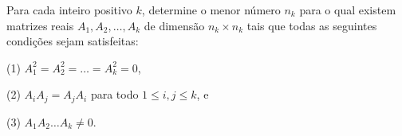 Para cada inteiro positivo \( k\), determine o menor número \( n_{k}\) para o qual existem matrizes reais \( A_{1}, A_{2}, \ldots, A_{k}\) de dimensão \( n_{k}\times n_{k}\) tais que todas as seguintes condições sejam satisfeitas:

(1) \( A_{1}^{2}= A_{2}^{2}= \ldots = A_{k}^{2}= 0\),

(2) \( A_{i}A_{j}= A_{j}A_{i}\) para todo \( 1 \le i, j \le k\), e

(3) \( A_{1}A_{2}\ldots A_{k}\ne 0\).
